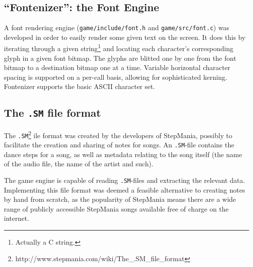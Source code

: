 \subsection{``Fontenizer'': the Font Engine}
	A font rendering engine (\texttt{game/include/font.h} and \texttt{game/src/font.c}) was developed in order to easily render some given text on the screen.
	It does this by iterating through a given string\footnote{Actually a C string.} and locating each character's corresponding glyph in a given font bitmap.
	The glyphs are blitted one by one from the font bitmap to a destination bitmap one at a time.
    Variable horizontal character spacing is supported on a per-call basis, allowing for sophisticated kerning.
    Fontenizer supports the basic ASCII character set.
        
\subsection{The \texttt{.SM} file format}
The \texttt{.SM}\footnote{http://www.stepmania.com/wiki/The_.SM_file_format} ile format was created by the developers of StepMania, possibly to facilitate the creation and sharing of notes for songs.
An \texttt{.SM}-file contains the dance steps for a song, as well as metadata relating to the song itself (the name of the audio file, the name of the artist and such).

The game engine is capable of reading \texttt{.SM}-files and extracting the relevant data.
Implementing this file format was deemed a feasible alternative to creating notes by hand from scratch, as the popularity of StepMania means there are a wide range of publicly accessible StepMania songs available free of charge on the internet.